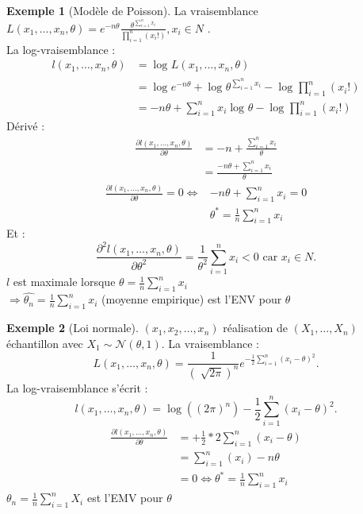 \documentclass{article}
\theoremstyle{plain}%
\theoremstyle{definition}
\newtheorem{exmp}{Exemple}[section]
\theoremstyle{remark}
\begin{document}
\begin{exmp}[Modèle de Poisson]
    La vraisemblance $ L(x_1, \dots, x_n, \theta ) = e^{-n \theta } \frac{\theta^{\sum_{i=1}^{n}x_i}}{\prod_{i=1}^{n}(x_i!)} , x_i \in N$ . \\
    La log-vraisemblance : \begin{align*}
        l(x_1, \dots, x_n, \theta )&= \log_{} L(x_1, \dots, x_n, \theta ) \\
        &= \log_{} e^{-n \theta } + \log_{} \theta ^{\sum_{i=1}^{n}x_i} - \log_{} \prod_{i=1}^{n}(x_i !) \\
        &= -n \theta + \sum_{i=1}^{n}x_i \log_{} \theta - \log_{} \prod_{i=1}^{n}(x_i !)
    \end{align*}
    Dérivé : \begin{align*}
        \frac{\partial l(x_1, \dots, x_n, \theta )}{ \partial \theta } &= -n + \frac{\sum_{i=1}^{n}x_i}{\theta } \\
        &= \frac{-n \theta + \sum_{i=1}^{n}x_i}{\theta }
    \end{align*}
    \begin{align*}
        \frac{\partial l(x_1, \dots, x_n, \theta )}{ \partial \theta } = 0 \Leftrightarrow & -n \theta + \sum_{i=1}^{n}x_i = 0 \\
        & \theta ^* = \frac{1}{n}\sum_{i=1}^{n}x_i
    \end{align*}
    Et : 
    \[
        \frac{\partial^2 l(x_1, \dots, x_n, \theta )}{ \partial \theta^2 } = \frac{1}{\theta ^2}\sum_{i=1}^{n}x_i < 0 \text{ car } x_i \in N  
    .\]
    $ l $ est maximale lorsque $\theta = \frac{1}{n}\sum_{i=1}^{n}x_i$ \\
    $\Rightarrow \hat{\theta _n} = \frac{1}{n}\sum_{i=1}^{n}x_i$ (moyenne empirique) est l'ENV pour $ \theta  $  
\end{exmp}
\begin{exmp}[Loi normale]
    $ (x_1,x_2,\dots,x_n) $ réalisation de $(X_1,\dots, X_n)$ échantillon avec $ X_1 \sim \mathcal{N}(\theta , 1) $. La vraisemblance : 
    \[
        L(x_1, \dots,x_n , \theta ) = \frac{1}{(\sqrt[]{2 \pi })^n}e^{-\frac{1}{2}\sum_{i=1}^{n}(x_i-\theta )^2}
    .\]
    La log-vraisemblance s'écrit : 
    \[
        l(x_1, \dots, x_n, \theta ) = \log((2 \pi)^n ) - \frac{1}{2}\sum_{i=1}^{n}(x_i-\theta )^2
    .\]
    \begin{align*}
        \frac{\partial l(x_1, \dots, x_n, \theta )}{ \partial \theta } &= + \frac{1}{2} * 2 \sum_{i=1}^{n}(x_i-\theta) \\
        &= \sum_{i=1}^{n}(x_i) - n \theta \\
        &= 0 \Leftrightarrow \theta^* = \frac{1}{n}\sum_{i=1}^{n}x_i
    \end{align*}
    $ \theta _n = \frac{1}{n}\sum_{i=1}^{n}X_i$ est l'EMV pour $ \theta  $ 
\end{exmp}
\end{document}
